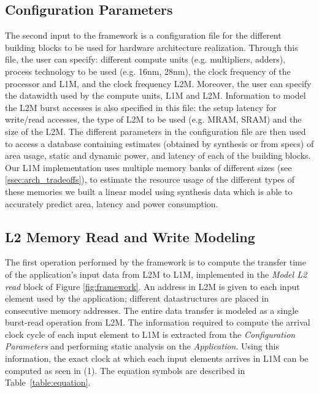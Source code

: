 \subsection{Configuration Parameters}
\label{ssec:conf_param}
\vspace{-1mm}
The second input to the framework is a configuration file for the different building blocks to be used for hardware architecture realization. Through this file, the user can specify: different compute units (e.g. multipliers, adders), process technology to be used (e.g. 16nm, 28nm), the clock frequency of the processor and L1M, and the clock frequency L2M. Moreover, the user can specify the datawidth used by the compute units, L1M and L2M.
Information to model the L2M burst accesses is also specified in this file: the setup latency for write/read accesses, the type of L2M to be used (e.g. MRAM, SRAM) and the size of the L2M. The different parameters in the configuration file are then used to access a database containing estimates (obtained by synthesis or from specs) of area usage, static and dynamic power, and latency of each of the building blocks. Our L1M implementation uses multiple memory banks of different sizes (see \ref{ssec:arch_tradeoffs}), to estimate the resource usage of the different types of these memories we built a linear model using synthesis data which is able to accurately predict area, latency and power consumption.

%

\vspace{-1mm}
\subsection{L2 Memory Read and Write Modeling}
\label{ssec:l2_read_model}
\vspace{-1mm}
The first operation performed by the framework is to compute the transfer time of the application's input data from L2M to L1M, implemented in the \textit{Model L2 read} block of Figure \ref{fig:framework}. An address in L2M is given to each input element used by the application; different datastructures are placed in consecutive memory addresses. The entire data transfer is modeled as a single burst-read operation from L2M. The information required to compute the arrival clock cycle of each input element to L1M is extracted from the \textit{Configuration Parameters} and performing static analysis on the \textit{Application}.
Using this information, the exact clock at which each input elements arrives in L1M can be computed as seen in (1). The equation symbols are described in Table~\ref{table:equation}.

